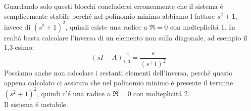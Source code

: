 \documentclass[../main.tex]{subfiles}
\begin{document}
		Guardando solo questi blocchi concluderei erroneamente che il sistema \'e semplicemente stabile perch\'e nel polinomio minimo abbiamo l fattore $ s^2+1 $, invece di $ (s^2+1)^2 $, quindi esiste una radice a $ \Re = 0 $ con molteplicit\'a 1. In realt\'a basta calcolare l'inversa di un elemento non sulla diagonale, ad esempio il 1,3-esimo:
		\[ (sI-A)^{-1}_{1,3} = \frac{s}{(s^+1)^2} \]
		Possiamo anche non calcolare i restanti elementi dell'inversa, perch\'e questo appena calcolato ci assicura che nel polinomio minimo \'e presente il termine $ (s^2+1)^2 $, quindi c'\'e una radice a $ \Re=0 $ con molteplicit\'a 2.\\
		Il sistema \'e instabile.
\end{document}
